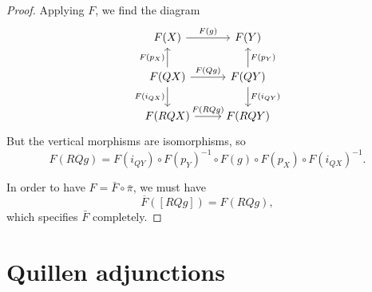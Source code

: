 \documentclass[main.tex]{subfiles}
\begin{document}
\begin{proof}
  Applying $F$, we find the diagram
  \begin{equation*}
    \begin{tikzcd}
      F(X)
      \arrow[r, "F(g)"]
      \arrow[d, leftarrow, swap, "F(p_{X})"]
      & F(Y)
      \arrow[d, leftarrow, "F(p_{Y})"]
      \\
      F(QX)
      \arrow[r, "F(Qg)"]
      \arrow[d, swap, "F(i_{QX})"]
      & F(QY)
      \arrow[d, "F(i_{QY})"]
      \\
      F(RQX)
      \arrow[r, "F(RQg)"]
      & F(RQY)
    \end{tikzcd}
  \end{equation*}
  But the vertical morphisms are isomorphisms, so
  \begin{equation*}
    F(RQg) = F(i_{QY}) \circ F(p_{Y})^{-1} \circ F(g) \circ F(p_{X}) \circ F(i_{QX})^{-1}.
  \end{equation*}

  In order to have $F = \bar{F} \circ \bar{\pi}$, we must have
  \begin{equation*}
    \overline{F}([RQg]) = F(RQg),
  \end{equation*}
  which specifies $\bar{F}$ completely.
\end{proof}

\section{Quillen adjunctions}
\label{sec:quillen_adjunctions}
\end{document}
